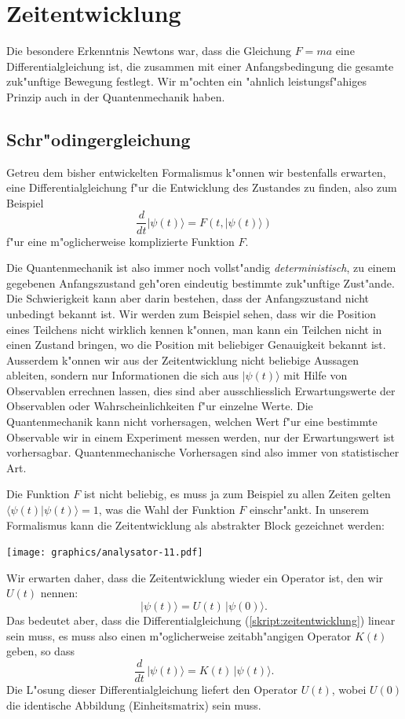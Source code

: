 %
%
\section{Zeitentwicklung}
Die besondere Erkenntnis Newtons war, dass die Gleichung $F=ma$ eine
Differentialgleichung ist, die zusammen mit einer Anfangsbedingung die
gesamte zuk"unftige Bewegung festlegt.
Wir m"ochten ein "ahnlich leistungsf"ahiges Prinzip auch in der
Quantenmechanik haben.

\subsection{Schr"odingergleichung}
Getreu dem bisher entwickelten Formalismus k"onnen wir bestenfalls
erwarten, eine Differentialgleichung f"ur die Entwicklung des Zustandes
zu finden, also zum Beispiel
\begin{equation}
\frac{d}{dt}|\psi(t)\rangle = F(t, |\psi(t)\rangle)
\label{skript:zeitentwicklung}
\end{equation}
f"ur eine m"oglicherweise komplizierte Funktion $F$.

Die Quantenmechanik ist also immer noch vollst"andig {\em deterministisch},
zu einem gegebenen Anfangszustand geh"oren eindeutig bestimmte
zuk"unftige Zust"ande.
Die Schwierigkeit kann aber darin bestehen, dass der Anfangszustand nicht
unbedingt bekannt ist.
Wir werden zum Beispiel sehen, dass wir die Position eines Teilchens
nicht wirklich kennen k"onnen, man kann ein Teilchen nicht in
einen Zustand bringen, wo die Position mit beliebiger Genauigkeit
bekannt ist.
Ausserdem k"onnen wir aus der Zeitentwicklung nicht beliebige Aussagen
ableiten, sondern nur Informationen die sich aus $|\psi(t)\rangle$ 
mit Hilfe von Observablen errechnen lassen,
dies sind aber ausschliesslich Erwartungswerte der Observablen oder
Wahrscheinlichkeiten f"ur einzelne Werte.
Die Quantenmechanik kann nicht vorhersagen, welchen Wert f"ur eine
bestimmte Observable wir in einem Experiment messen werden,
nur der Erwartungswert ist vorhersagbar.
Quantenmechanische Vorhersagen sind also immer von statistischer Art.


Die Funktion $F$ ist nicht beliebig, es muss ja zum Beispiel zu allen Zeiten
gelten
$\langle\psi(t)|\psi(t)\rangle=1$, was die Wahl der Funktion $F$ einschr"ankt.
In unserem Formalismus kann die Zeitentwicklung als abstrakter Block
gezeichnet werden:
\begin{center}
\texttt{[image: graphics/analysator-11.pdf]}
\end{center}
Wir erwarten daher, dass die Zeitentwicklung wieder ein Operator ist,
den wir $U(t)$ nennen:
\[
|\psi(t)\rangle = U(t)\,|\psi(0)\rangle.
\]
Das bedeutet aber, dass die Differentialgleichung (\ref{skript:zeitentwicklung})
linear sein muss, es muss also einen m"oglicherweise zeitabh"angigen
Operator $K(t)$ geben, so dass 
\begin{equation}
\frac{d}{dt}\,|\psi(t)\rangle = K(t)\,|\psi(t)\rangle.
\label{skript:zeitentwicklung-linear}
\end{equation}
Die L"osung dieser Differentialgleichung liefert den Operator $U(t)$,
wobei $U(0)$ die identische Abbildung (Einheitsmatrix) sein muss.

